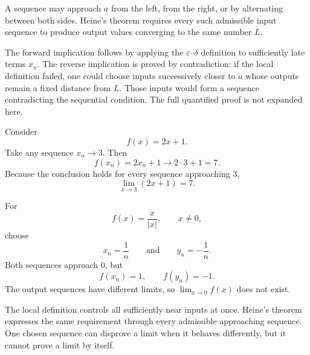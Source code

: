 \begin{interpretationbox}
A sequence may approach $a$ from the left, from the right, or by alternating between both sides. Heine's theorem requires every such admissible input sequence to produce output values converging to the same number $L$.
\end{interpretationbox}

\begin{remarkbox}
The forward implication follows by applying the $\varepsilon$--$\delta$ definition to sufficiently late terms $x_n$. The reverse implication is proved by contradiction: if the local definition failed, one could choose inputs successively closer to $a$ whose outputs remain a fixed distance from $L$. Those inputs would form a sequence contradicting the sequential condition. The full quantified proof is not expanded here.
\end{remarkbox}

\begin{examplebox}
Consider
\[
f(x)=2x+1.
\]
Take any sequence $x_n\to3$. Then
\[
f(x_n)=2x_n+1\to2\cdot3+1=7.
\]
Because the conclusion holds for every sequence approaching $3$,
\[
\lim_{x\to3}(2x+1)=7.
\]
\end{examplebox}

\begin{examplebox}
For
\[
f(x)=\frac{x}{|x|},\qquad x\ne0,
\]
choose
\[
x_n=\frac1n
\qquad\text{and}\qquad
y_n=-\frac1n.
\]
Both sequences approach $0$, but
\[
f(x_n)=1,
\qquad
f(y_n)=-1.
\]
The output sequences have different limits, so $\lim_{x\to0}f(x)$ does not exist.
\end{examplebox}

\begin{interpretationbox}
The local definition controls all sufficiently near inputs at once. Heine's theorem expresses the same requirement through every admissible approaching sequence. One chosen sequence can disprove a limit when it behaves differently, but it cannot prove a limit by itself.
\end{interpretationbox}
